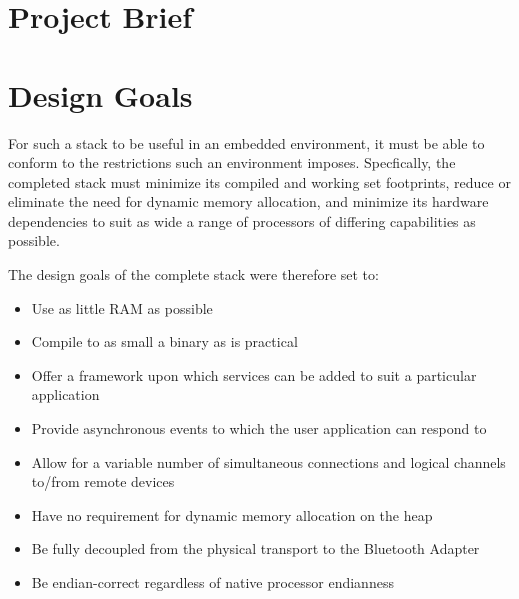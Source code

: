 \section{Project Brief}



\section{Design Goals}

For such a stack to be useful in an embedded environment, it must be able to conform
to the restrictions such an environment imposes. Specfically, the completed stack must
minimize its compiled and working set footprints, reduce or eliminate the need for
dynamic memory allocation, and minimize its hardware dependencies to suit as wide a
range of processors of differing capabilities as possible.

The design goals of the complete stack were therefore set to:

\begin{itemize}
	\item Use as little RAM as possible
	\item Compile to as small a binary as is practical
	\item Offer a framework upon which services can be added to suit a particular application
	\item Provide asynchronous events to which the user application can respond to
	\item Allow for a variable number of simultaneous connections and logical channels to/from remote devices
	\item Have no requirement for dynamic memory allocation on the heap
	\item Be fully decoupled from the physical transport to the Bluetooth Adapter
	\item Be endian-correct regardless of native processor endianness
\end{itemize}


